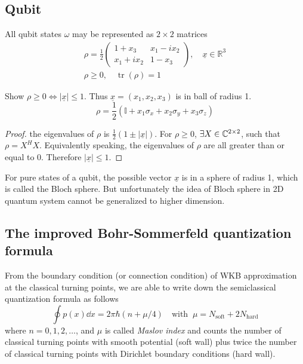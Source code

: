 \documentclass[10pt]{article}
\begin{document}
	\subsection{Qubit}
	All qubit states $\omega$ may be represented as $2 \times 2$ matrices
	\begin{gather}
		\rho = \frac{1}{2}
		\begin{pmatrix}
			1 + x_3 & x_1 - i x_2 \\
			x_1 + i x_2 & 1 - x_3
		\end{pmatrix} , \quad \underline{x} \in \mathbb{R}^3\\
		\rho \ge 0 , \quad \operatorname{tr}(\rho) = 1
	\end{gather}
	\begin{example}
		Show $\rho \ge 0 \Leftrightarrow |\underline{x}| \le 1$. Thus $\underline{x} = (x_1, x_2, x_3)$ is in ball of radius 1.
		\begin{equation}
			\rho = \frac{1}{2}(\mathbb{I} + x_1 \sigma_x + x_2 \sigma_y + x_3 \sigma_z)
		\end{equation}
	\end{example}
	\begin{proof}
		the eigenvalues of $\rho$ is $\frac{1}{2} (1 \pm |\underline{x}|)$. For $\rho \ge 0$, $\exists X \in {\mathbb{C}}^{2 \times 2}$, such that $\rho = X^H X$.
		Equivalently speaking, the eigenvalues of $\rho$ are all greater than or equal to 0. Therefore $|\underline{x}| \le 1$.
	\end{proof}
	For pure states of a qubit, the possible vector $\underline{x}$ is in a sphere of radius 1, which is called the Bloch sphere. But unfortunately the idea of Bloch sphere in 2D quantum system cannot be generalized to higher dimension.

	\subsection{The improved Bohr-Sommerfeld quantization formula}
	\begin{theorem}
		From the boundary condition (or connection condition) of WKB approximation at the classical turning points, we are able to write down the semiclassical quantization formula as follows
		\begin{equation}
			\oint p(x) \dd x = 2 \pi \hbar (n + \mu/4) \quad \text{with } \ \mu = N_{\text{soft}} + 2N_{\text{hard}}
		\end{equation}
		where $n = 0,1,2,\dots$, and $\mu$ is called \textit{Maslov index} and counts the number of classical turning points with smooth potential (soft wall) plus twice the number of classical turning points with Dirichlet boundary conditions (hard wall).
	\end{theorem}
\end{document}
